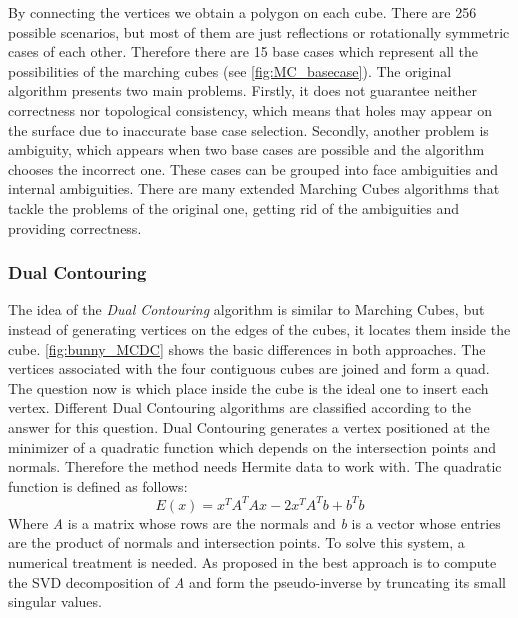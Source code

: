 By connecting the vertices we obtain a polygon on each cube. There are 256 possible scenarios,
but most of them are just reflections or rotationally symmetric cases of each other. Therefore
there are 15 base cases which represent all the possibilities of the marching cubes (see \autoref{fig:MC_basecase}). 
The original algorithm presents two main problems. Firstly, it does not guarantee neither
correctness nor topological consistency, which means that holes may appear on the surface due
to inaccurate base case selection. Secondly, another problem is ambiguity, which appears when two
base cases are possible and the algorithm chooses the incorrect one. These cases can be grouped
into face ambiguities and internal ambiguities. There are many extended Marching Cubes
algorithms that tackle the problems of the original one, getting rid of the ambiguities and
providing correctness.

\subsubsection{Dual Contouring}
The idea of the \emph{Dual Contouring} algorithm is similar to Marching Cubes, but instead of generating vertices on the
edges of the cubes, it locates them inside the cube. \autoref{fig:bunny_MCDC} shows the basic differences in both approaches.
The vertices associated with the four contiguous cubes are joined and form a quad. The question now is
which place inside the cube is the ideal one to insert each vertex. Different Dual Contouring algorithms are classified 
according to the answer for this question. Dual Contouring generates a vertex positioned at the minimizer of a
quadratic function which depends on the intersection points and normals. Therefore the method needs Hermite 
data to work with. The quadratic function is defined as follows:
\begin{equation*}
E(x)= x^TA^TAx-2x^TA^Tb+b^Tb
\end{equation*}
Where \textit{A} is a matrix whose rows are the normals and \textit{b} is a vector whose entries are the product of normals and intersection points. To solve this system, a numerical treatment is needed. As proposed in \cite{Hermite2002} the best approach is to compute the
SVD decomposition of \textit{A} and form the pseudo-inverse by truncating its small singular values. 


